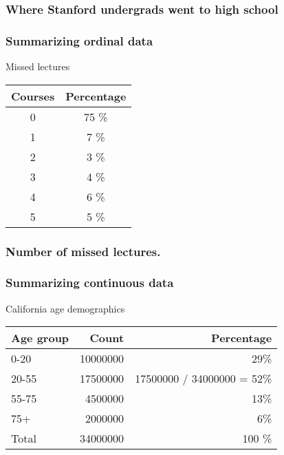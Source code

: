 \documentclass[handout]{beamer}
\begin{document}
   \begin{frame}
   \frametitle{Where Stanford undergrads went to high school}
   \begin{center}
   \end{center}

   \end{frame}


   \begin{frame} \frametitle{Summarizing ordinal data}

   \begin{block}
   {Missed lectures}
   \begin{tabular}{cc}
   Courses & Percentage \\ \hline
   0 & 75 \% \\
   1 & 7 \% \\
   2 & 3 \% \\
   3 & 4 \% \\
   4 & 6 \% \\
   5 & 5 \% \\
   \end{tabular}
   \end{block}
   \end{frame}



   \begin{frame}
   \frametitle{Number of missed lectures.}
   \begin{center}
   \end{center}

   \end{frame}


   \begin{frame} \frametitle{Summarizing continuous data}

   \begin{block}
   {California age demographics}
   \begin{tabular}{l|rr}
   Age group & Count & Percentage \\ \hline
   0-20 & 10000000 & 29\%\\
   20-55 & 17500000 & 17500000 / 34000000 =  52\% \\
   55-75 & 4500000 & 13\%\\
   75+ & 2000000 & 6\%\\ \hline
   Total & 34000000 & 100 \%
   \end{tabular}
   \end{block}
   \end{frame}
\end{document}
